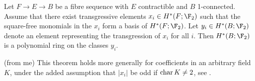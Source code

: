 \begin{theorem}\label{thm:borel}
	Let $F \to E \to B$ be a fibre sequence with $E$ contractible and $B$ 1-connected.
	Assume that there exist transgressive elements $x_i \in H^*(F; \F_2)$ such that the square-free monomials in the $x_i$ form a basis of $H^*(F; \F_2)$.
	Let $y_i \in H^*(B; \F_2)$ denote an element representing the transgression of $x_i$ for all $i$.
	Then $H^*(B; \F_2)$ is a polynomial ring on the classes $y_i$.
\end{theorem}
\begin{remark}
	(from me) This theorem holds more generally for coefficients in an arbitrary field $K$, under the added assumption that $|x_i|$ be odd if $\operatorname{char} K \neq 2$, see \cite[Thm. 5.34]{hatcher_chapter_nodate}.
\end{remark}
